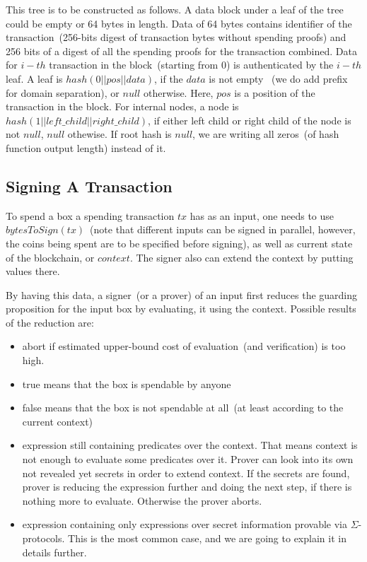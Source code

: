 \documentclass[]{article}   %
\newcommand{\coin}{box}
\begin{document}
This tree is to be constructed as follows. A data block under a leaf of the tree could be empty or 64 bytes in length.
Data of 64 bytes contains identifier of the transaction~(256-bits digest of transaction bytes without spending proofs)
and 256 bits of a digest of all the spending proofs for the transaction combined. Data for $i-th$ transaction
in the block~(starting from 0) is authenticated by the $i-th$ leaf.
A leaf is $hash(0 || pos || data)$, if the $data$ is not empty
~(we do add prefix for domain separation), or $null$ otherwise. Here, $pos$ is a position of the transaction in the block.
 For internal nodes, a node is $hash(1 || left\_child || right\_child)$, if either left child or right child of the
 node is not $null$, $null$ othewise. If root hash is $null$, we are writing all zeros~(of hash function output length)
 instead of it.

\subsection{Signing A Transaction}

To spend a \coin{} a spending transaction $tx$ has as an input, one needs to use $bytesToSign(tx)$~(note that different inputs
can be signed in parallel, however, the coins being spent are to be specified before signing), as well as current state
of the blockchain, or $context$. The signer also can extend the context by putting values there.

By having this data, a signer~(or a prover) of an input first reduces the guarding proposition for the input \coin{} by
evaluating, it using the context. Possible results of the reduction are:

\begin{itemize}
    \item{abort} if estimated upper-bound cost of evaluation~(and verification) is too high.
    \item{true} means that the \coin{} is spendable by anyone
    \item{false} means that the \coin{} is not spendable at all~(at least according to the current context)
    \item{expression still containing predicates over the context. } That means context is not enough to evaluate
    some predicates over it. Prover can look into its own not revealed yet secrets in order to extend context. If the
    secrets are found, prover is reducing the expression further and doing the next step, if there is nothing more to
    evaluate. Otherwise the prover aborts.
    \item{expression containing only expressions over secret information provable via $\Sigma$-protocols. } This is the
    most common case, and we are going to explain it in details further.
\end{itemize}
\end{document}
